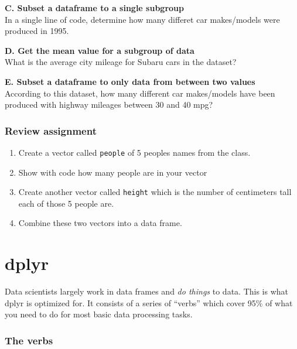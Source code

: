 \documentclass[
]{book}
\begin{document}
\textbf{C. Subset a dataframe to a single subgroup}\\
In a single line of code, determine how many differet car makes/models were produced in 1995.

\textbf{D. Get the mean value for a subgroup of data}\\
What is the average city mileage for Subaru cars in the dataset?

\textbf{E. Subset a dataframe to only data from between two values}\\
According to this dataset, how many different car makes/models have been produced with highway mileages between 30 and 40 mpg?

\hypertarget{review-assignment-7}{%
\subsubsection*{Review assignment}\label{review-assignment-7}}

\begin{enumerate}
\def\labelenumi{\arabic{enumi}.}
\item
  Create a vector called \texttt{people} of 5 peoples names from the class.
\item
  Show with code how many people are in your vector
\item
  Create another vector called \texttt{height} which is the number of centimeters tall each of those 5 people are.
\item
  Combine these two vectors into a data frame.
\end{enumerate}

\hypertarget{dplyr}{%
\section*{dplyr}\label{dplyr}}

Data scientists largely work in data frames and \emph{do things} to data. This is what dplyr is optimized for. It consists of a series of ``verbs'' which cover 95\% of what you need to do for most basic data processing tasks.

\hypertarget{the-verbs}{%
\subsubsection*{The verbs}\label{the-verbs}}
\end{document}
